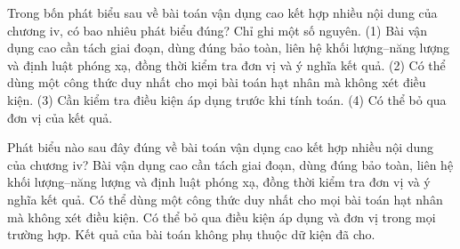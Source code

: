 \begin{ex}
Trong bốn phát biểu sau về bài toán vận dụng cao kết hợp nhiều nội dung của chương iv, có bao nhiêu phát biểu đúng? Chỉ ghi một số nguyên. (1) Bài vận dụng cao cần tách giai đoạn, dùng đúng bảo toàn, liên hệ khối lượng–năng lượng và định luật phóng xạ, đồng thời kiểm tra đơn vị và ý nghĩa kết quả. (2) Có thể dùng một công thức duy nhất cho mọi bài toán hạt nhân mà không xét điều kiện. (3) Cần kiểm tra điều kiện áp dụng trước khi tính toán. (4) Có thể bỏ qua đơn vị của kết quả.
\end{ex}

\begin{ex}
Phát biểu nào sau đây đúng về bài toán vận dụng cao kết hợp nhiều nội dung của chương iv?
\choice
{\True Bài vận dụng cao cần tách giai đoạn, dùng đúng bảo toàn, liên hệ khối lượng–năng lượng và định luật phóng xạ, đồng thời kiểm tra đơn vị và ý nghĩa kết quả.}
{Có thể dùng một công thức duy nhất cho mọi bài toán hạt nhân mà không xét điều kiện.}
{Có thể bỏ qua điều kiện áp dụng và đơn vị trong mọi trường hợp.}
{Kết quả của bài toán không phụ thuộc dữ kiện đã cho.}
\end{ex}

